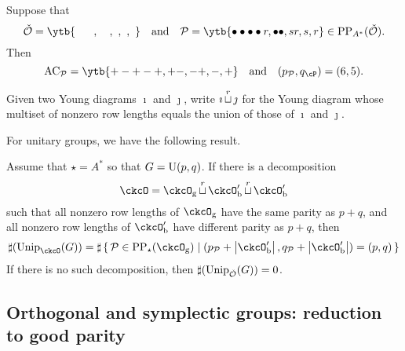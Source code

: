 \documentclass[counting_main.tex]{subfiles}
\begin{document}
\begin{eg}
  Suppose
  that \[ \check \CO=\ytb{\ \ \ \ \ , \ \ \ , \ , \ , \ }\quad \textrm{and}\quad \CP=\ytb{\bullet\bullet\bullet\bullet r,\bullet\bullet , sr,s,r}\in \mathrm{PP}_{A^*}(\check \CO) .
  \]
  Then
  \[
    \mathrm{AC}_\CP= \ytb{+-+-+,+-, -+,-,+}\quad \textrm{and} \quad (p_\CP, q_\cP)=(6,5).
  \]
\end{eg}

Given two Young diagrams $\imath$ and $\jmath$, write $\imath{\,\stackrel{r}{\sqcup}\,} \jmath$ for
the Young diagram whose multiset of nonzero row lengths equals the union of
those of $\imath$ and $\jmath$.

For unitary groups, we have the following result.
\begin{thm}
  Assume that $\star=A^*$ so that $G=\operatorname{U}(p,q)$. If there is a decomposition
  \[
    \ckcO=\ckcOg \cuprow \ckcOpb \cuprow \ckcOpb
  \]
  such that all nonzero row lengths of $\ckcOg$ have the same parity as $p+q$,
  and all nonzero row lengths of $\ckcOpb$ have different parity as $p+q$, then
  \[
    \sharp(\Unip_{\ckcO}(G))= \sharp \set{\CP\in \mathrm{PP}_\star(\ckcOg)|(p_\CP+\abs{\ckcOpb}, q_\CP+\abs{\ckcOpb})=(p,q)}
  \]
  If there is no such decomposition, then $\sharp(\mathrm{Unip}_{\check {{\mathcal {O}}}}(G))=0$.

\end{thm}

\subsection{Orthogonal and symplectic groups: reduction to good parity}
\end{document}
